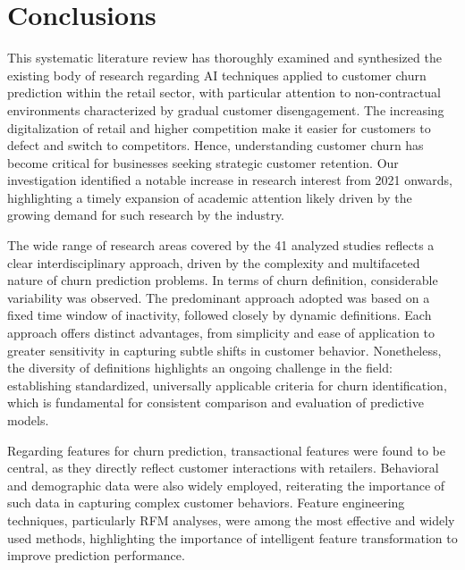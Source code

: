 \section{Conclusions}
\label{sec:conclusions}

This systematic literature review has thoroughly examined and synthesized the existing body of research regarding AI techniques applied to customer churn prediction within the retail sector, with particular attention to non-contractual environments characterized by gradual customer disengagement. The increasing digitalization of retail and higher competition make it easier for customers to defect and switch to competitors. Hence, understanding customer churn has become critical for businesses seeking strategic customer retention.
Our investigation identified a notable increase in research interest from 2021 onwards, highlighting a timely expansion of academic attention likely driven by the growing demand for such research by the industry.

The wide range of research areas covered by the 41 analyzed studies reflects a clear interdisciplinary approach, driven by the complexity and multifaceted nature of churn prediction problems.
In terms of churn definition, considerable variability was observed. The predominant approach adopted was based on a fixed time window of inactivity, followed closely by dynamic definitions. Each approach offers distinct advantages, from simplicity and ease of application to greater sensitivity in capturing subtle shifts in customer behavior. Nonetheless, the diversity of definitions highlights an ongoing challenge in the field: establishing standardized, universally applicable criteria for churn identification, which is fundamental for consistent comparison and evaluation of predictive models.

Regarding features for churn prediction, transactional features were found to be central, as they directly reflect customer interactions with retailers. Behavioral and demographic data were also widely employed, reiterating the importance of such data in capturing complex customer behaviors. Feature engineering techniques, particularly RFM analyses, were among the most effective and widely used methods, highlighting the importance of intelligent feature transformation to improve prediction performance.

